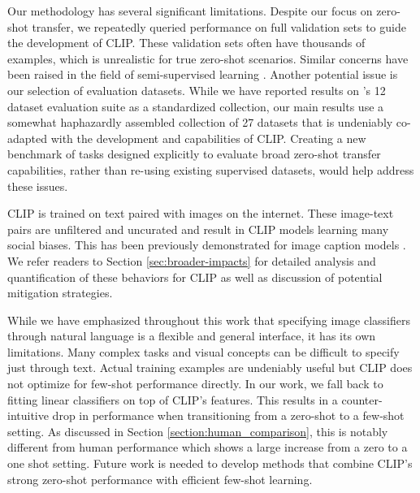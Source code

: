 \documentclass{article}
\begin{document}
Our methodology has several significant limitations. Despite our focus on zero-shot transfer, we repeatedly queried performance on full validation sets to guide the development of CLIP. These validation sets often have thousands of examples, which is unrealistic for true zero-shot scenarios. Similar concerns have been raised in the field of semi-supervised learning \citep{oliver2018realistic}. Another potential issue is our selection of evaluation datasets. While we have reported results on \citet{kornblith2019better}'s 12 dataset evaluation suite as a standardized collection, our main results use a somewhat haphazardly assembled collection of 27 datasets that is undeniably co-adapted with the development and capabilities of CLIP. Creating a new benchmark of tasks designed explicitly to evaluate broad zero-shot transfer capabilities, rather than re-using existing supervised datasets, would help address these issues.

CLIP is trained on text paired with images on the internet. These image-text pairs are unfiltered and uncurated and result in CLIP models learning many social biases. This has been previously demonstrated for image caption models \citep{bhargava2019exposing}. We refer readers to Section \ref{sec:broader-impacts} for detailed analysis and quantification of these behaviors for CLIP as well as discussion of potential mitigation strategies.

While we have emphasized throughout this work that specifying image classifiers through natural language is a flexible and general interface, it has its own limitations. Many complex tasks and visual concepts can be difficult to specify just through text. Actual training examples are undeniably useful but CLIP does not optimize for few-shot performance directly. In our work, we fall back to fitting linear classifiers on top of CLIP's features. This results in a counter-intuitive drop in performance when transitioning from a zero-shot to a few-shot setting. As discussed in Section \ref{section:human_comparison}, this is notably different from human performance which shows a large increase from a zero to a one shot setting. Future work is needed to develop methods that combine CLIP's strong zero-shot performance with efficient few-shot learning.
\end{document}
